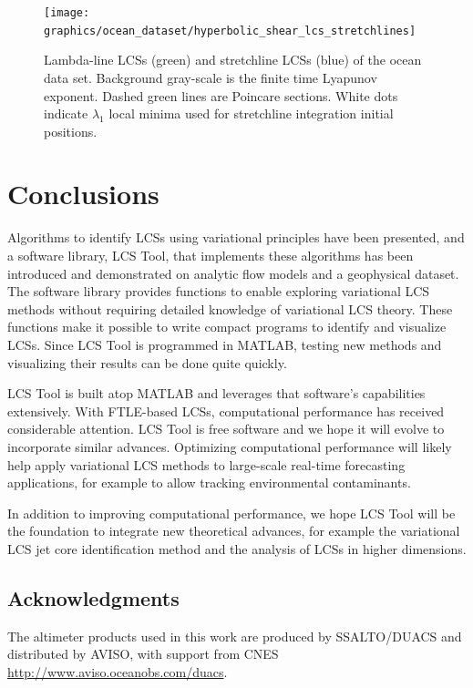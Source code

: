 \documentclass{article}
\begin{document}
\begin{figure}
\begin{center}
\texttt{[image: graphics/ocean\_dataset/hyperbolic\_shear\_lcs\_stretchlines]}
\end{center}
\caption{Lambda-line LCSs (green) and stretchline LCSs (blue) of the ocean data set. Background gray-scale is the finite time Lyapunov exponent. Dashed green lines are Poincare sections. White dots indicate $\lambda_1$ local minima used for stretchline integration initial positions.}
\label{f:ocean dataset hyperbolic shear lcs details stretchline}
\end{figure}

\clearpage

\section{Conclusions}

Algorithms to identify LCSs using variational principles have been presented, and a software library, LCS Tool, that implements these algorithms has been introduced and demonstrated on analytic flow models and a geophysical dataset. The software library provides functions to enable exploring variational LCS methods without requiring detailed knowledge of variational LCS theory. These functions make it possible to write compact programs to identify and visualize LCSs. Since LCS Tool is programmed in MATLAB, testing new methods and visualizing their results can be done quite quickly.

LCS Tool is built atop MATLAB and leverages that software's capabilities extensively. With FTLE-based LCSs, computational performance has received considerable attention\parencite{conti12:_gpu_apu_finit_time_lyapun_expon,miron12:_anisot_lagran_coher_struc}. LCS Tool is free software and we hope it will evolve to incorporate similar advances. Optimizing computational performance will likely help apply variational LCS methods to large-scale real-time forecasting applications, for example to allow tracking environmental contaminants.

In addition to improving computational performance, we hope LCS Tool will be the foundation to integrate new theoretical advances, for example the variational LCS jet core identification method\parencite{farazmand13:_shearless} and the analysis of LCSs in higher dimensions\parencite{blazevski:_hyper_ellip_trans_barrier_three}.

\subsection*{Acknowledgments}

The altimeter products used in this work are produced by SSALTO/DUACS and distributed by AVISO, with support from CNES \url{http://www.aviso.oceanobs.com/duacs}.

\printbibliography
\end{document}
